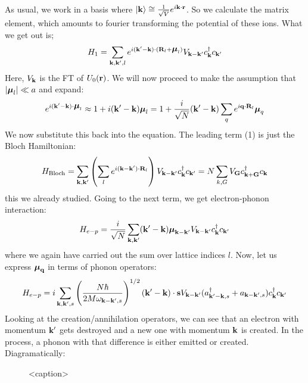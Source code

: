 As usual, we work in a basis where $\lvert \mathbf{k} \rangle \cong \frac{1}{\sqrt{V}}e^{i\mathbf{k} \cdot \mathbf{r}}$. So we calculate the matrix element, which amounts to fourier transforming the potential of these ions. What we get out is;
\begin{equation}
    H_1 = \sum_{\mathbf{k}, \mathbf{k}', l} e^{i(\mathbf{k}' - \mathbf{k}) \cdot (\mathbf{R}_l + \mbox{\boldmath$ \mu $}_l)}V_{\mathbf{k} - \mathbf{k}'}c^\dagger_{\mathbf{k}}c_{\mathbf{k}'}
\end{equation}
Here, $V_{\mathbf{k}}$ is the FT of $U_0(\mathbf{r})$. We will now proceed to make the assumption that $\lvert \mbox{\boldmath$ \mu $}_l \rvert \ll a$ and expand:
\begin{equation}
    e^{i(\mathbf{k}' - \mathbf{k})\cdot\mbox{\boldmath$ \mu $}_l} \approx 1 + i(\mathbf{k}' - \mathbf{k})\mbox{\boldmath$ \mu $}_l = 1 + \frac{i}{\sqrt{N}}(\mathbf{k}' - \mathbf{k})\sum_q e^{i\mathbf{q} \cdot \mathbf{R}_l}\mbox{\boldmath$ \mu $}_q
\end{equation}
We now substitute this back into the equation. The leading term (1) is just the Bloch Hamiltonian:
\begin{equation}
    H_{\text{Bloch}} = \sum_{\mathbf{k}, \mathbf{k}'}\left(\sum_l e^{i(\mathbf{k} - \mathbf{k}')\cdot \mathbf{R}_l}\right)V_{\mathbf{k} - \mathbf{k}'}c^\dagger_{\mathbf{k}}c_{\mathbf{k}'} = N\sum_{k, G}V_{\mathbf{G}}c^\dagger_{\mathbf{k} + \mathbf{G}}c_{\mathbf{k}}
\end{equation}
this we already studied. Going to the next term, we get electron-phonon interaction:
\begin{equation}
    H_{e-p} = \frac{i}{\sqrt{N}}\sum_{\mathbf{k}, \mathbf{k}'}(\mathbf{k}' - \mathbf{k})\mbox{\boldmath$ \mu $}_{\mathbf{k} - \mathbf{k}'}V_{\mathbf{k} - \mathbf{k}'}c^\dagger_{\mathbf{k}}c_{\mathbf{k}'}
\end{equation}
where we again have carried out the sum over lattice indices $l$. Now, let us express $\mbox{\boldmath$ \mu $}_{\mathbf{q}}$ in terms of phonon operators:
\begin{equation}
    H_{e-p} = i\sum_{\mathbf{k}, \mathbf{k}', s}\left(\frac{N\hbar}{2M\omega_{\mathbf{k} - \mathbf{k}', s}}\right)^{1/2}(\mathbf{k}' - \mathbf{k})\cdot \mathbf{s}V_{\mathbf{k} - \mathbf{k}'}(a^\dagger_{\mathbf{k}' - \mathbf{k}, s} + a_{\mathbf{k} - \mathbf{k}', s})c^\dagger_{\mathbf{k}}c_{\mathbf{k}'}
\end{equation}
Looking at the creation/annihilation operators, we can see that an electron with momentum $\mathbf{k}'$ gets destroyed and a new one with momentum $\mathbf{k}$ is created. In the process, a phonon with that difference is either emitted or created. Diagramatically:

\begin{figure}[htbp]
    \centering
    
    \caption{<caption>}
    \label{<label>}
\end{figure}

